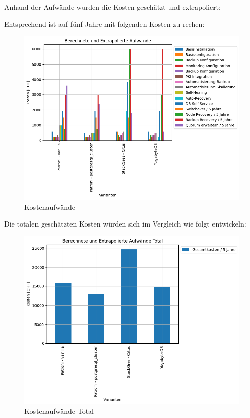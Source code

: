 \begin{flushleft}
    Anhand der Aufwände wurden die Kosten geschätzt und extrapoliert:
    
    Entsprechend ist auf fünf Jahre mit folgenden Kosten zu rechen:
    \begin{figure}[H]
        \centering
        \includegraphics[width=0.75\linewidth]{source/pandas_data_chart_plotter/cost_investment}
        \caption{Kostenaufwände}
        \label{fig:cost_investment}
    \end{figure}
\end{flushleft}
\begin{flushleft}
    Die totalen geschätzten Kosten würden sich im Vergleich wie folgt entwickeln:
    \begin{figure}[H]
        \centering
        \includegraphics[width=0.75\linewidth]{source/pandas_data_chart_plotter/cost_investment_summe}
        \caption{Kostenaufwände Total}
        \label{fig:cost_investment_summe}
    \end{figure}
\end{flushleft}
